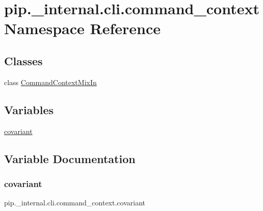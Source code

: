 \hypertarget{namespacepip_1_1__internal_1_1cli_1_1command__context}{}\section{pip.\+\_\+internal.\+cli.\+command\+\_\+context Namespace Reference}
\label{namespacepip_1_1__internal_1_1cli_1_1command__context}
\subsection*{Classes}
\begin{DoxyCompactItemize}
\item 
class \hyperlink{classpip_1_1__internal_1_1cli_1_1command__context_1_1CommandContextMixIn}{Command\+Context\+Mix\+In}
\end{DoxyCompactItemize}
\subsection*{Variables}
\begin{DoxyCompactItemize}
\item 
\hyperlink{namespacepip_1_1__internal_1_1cli_1_1command__context_a0f91ba83779f5276daf79ccdf3be41ca}{covariant}
\end{DoxyCompactItemize}


\subsection{Variable Documentation}
\mbox{\label{namespacepip_1_1__internal_1_1cli_1_1command__context_a0f91ba83779f5276daf79ccdf3be41ca}} 
\subsubsection{\texorpdfstring{covariant}{covariant}}
{\footnotesize\ttfamily pip.\+\_\+internal.\+cli.\+command\+\_\+context.\+covariant}

